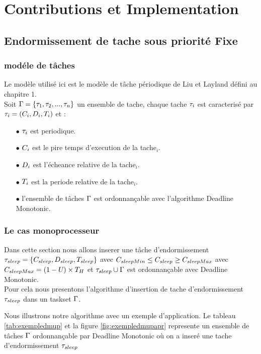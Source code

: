 \part{Contributions et Implementation}
\chapter{Endormissement de tache sous priorité Fixe}
\minitoc
\section{modéle de tâches}
\indent Le modèle utilisé ici est le modèle de tâche périodique de Liu et Layland défini au chapitre 1.\\
Soit $\Gamma = \{\tau_{1},\tau_{2},...,\tau_{n}\}$ un ensemble de tache, chaque tache $\tau_{i}$ est caracterisé par $\tau_{i} = (C_{i},D_{i},T_{i})$ et :
\begin{itemize}
\item[$\bullet$] $\tau_{i}$ est periodique.
\item[$\bullet$] $C_{i}$ est le pire temps d'execution de la tache$_i$.
\item[$\bullet$] $D_{i}$ est l'écheance relative de la tache$_i$.
\item[$\bullet$] $T_{i}$ est la periode relative de la tache$_i$.
\item[$\bullet$] l'ensemble de tâches $\Gamma$ est ordonnançable avec l'algorithme Deadline Monotonic.
\end{itemize}
\section{Le cas monoprocesseur}
\indent Dans cette section nous allons inserer une tâche d'endormissement $\tau_{sleep} = \{ C_{sleep}, D_{sleep}, T_{sleep}\}$
avec $C_{sleepMin} \leq C_{sleep} \geq C_{sleepMax}$ avec $C_{sleepMax} = (1-U_{}) \times T_{H}$ et $\tau_{sleep} \cup \Gamma$ est ordonnançable avec Deadline Monotonic. \\
\indent Pour cela nous presentons l'algorithme d'insertion de tache d'endormissement $\tau_{sleep}$ dans un taskset $\Gamma$.
 
\indent Nous illustrons notre algorithme avec un exemple d'application. Le tableau \ref{tab:exempledmup} et la figure \ref{fig:exempledmupapr} represente un ensemble de tâches $\Gamma$ 
ordonnançable par Deadline Monotonic où on a inseré une tache d'endormissement $\tau_{sleep}$

